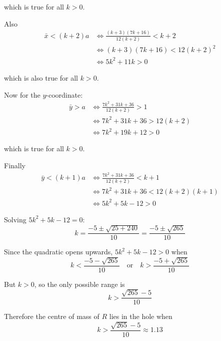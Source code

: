 \documentclass[leqno]{article}
\begin{document}
\begin{enumerate}[
  label=\textbf{\arabic*.},
  leftmargin=*,
  topsep=0pt,
  partopsep=0pt,
  parsep=0pt
]
\begin{djsSolution}
which is true for all $k>0$.

Also
\begin{align*}
\bar x<(k+2)a
&\iff \frac{(k+3)(7k+16)}{12(k+2)}<k+2\\
&\iff (k+3)(7k+16)<12(k+2)^2\\
&\iff 5k^2+11k>0
\end{align*}

which is also true for all $k>0$.

Now for the $y$-coordinate:
\begin{align*}
\bar y>a
&\iff \frac{7k^2+31k+36}{12(k+2)}>1\\
&\iff 7k^2+31k+36>12(k+2)\\
&\iff 7k^2+19k+12>0
\end{align*}

which is true for all $k>0$.

Finally
\begin{align*}
\bar y<(k+1)a
&\iff \frac{7k^2+31k+36}{12(k+2)}<k+1\\
&\iff 7k^2+31k+36<12(k+2)(k+1)\\
&\iff 5k^2+5k-12>0
\end{align*}

Solving $5k^2+5k-12=0$:
\[
k=\frac{-5\pm\sqrt{25+240}}{10}=\frac{-5\pm\sqrt{265}}{10}
\]

Since the quadratic opens upwards, $5k^2+5k-12>0$ when
\[
k<\frac{-5-\sqrt{265}}{10}
\quad\text{or}\quad
k>\frac{-5+\sqrt{265}}{10}
\]

But $k>0$, so the only possible range is
\[
k>\frac{\sqrt{265}-5}{10}
\]

Therefore the centre of mass of $R$ lies in the hole when
\[
k>\frac{\sqrt{265}-5}{10}\approx 1.13
\]
\end{djsSolution}


\end{enumerate}
\end{document}
